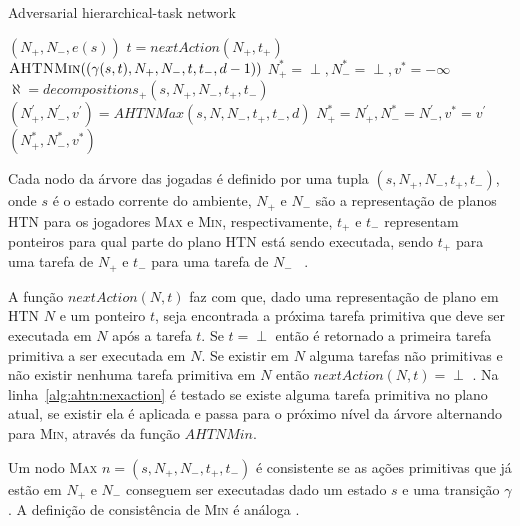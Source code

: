 \begin{algorithm}
	\caption{Adversarial hierarchical-task network}
	\label{alg:ahtn}
	\begin{algorithmic}[1]		
		\label{alg:lin:firstLine}
		\State	\Return $(N_{+}, N_{-}, e(s))$
		\EndIf
		 \label{alg:ahtn:nexaction}
		\State $t = nextAction(N_{+}, t_{+})$ 
		\State \Return $\Call{AHTNMin}{(\gamma(s,t), N_{+}, N_{-}, t, t_{-}, d-1)}$ \label{alg:ahtn:troca}
		\EndIf
		\State $N_{+}^{*} = \perp, N_{-}^{*} = \perp, v^{*} = -\infty$
		\State $\aleph = decompositions_{+}(s, N_{+}, N_{-}, t_{+}, t_{-})$ \label{alg:decompositions}
		 \label{alg:ahtn:for}
		\State $(N^{'}_{+}, N^{'}_{-}, v^{'}) = AHTNMax(s, N, N_{-}, t_{+}, t_{-}, d)$
		\State $N_{+}^{*} = N^{'}_{+}, N_{-}^{*} = N^{'}_{-}, v^{*} = v^{'} $
		\EndIf
		\EndFor		
		\State \Return $(N_{+}^{*}, N_{-}^{*}, v^{*} )$
		\EndFunction
	\end{algorithmic}
\end{algorithm}

Cada nodo da árvore das jogadas é definido por uma tupla $(s, N_{+}, N_{-}, t_{+}, t_{-})$, onde $s$ é o estado corrente do ambiente, $N_{+}$ e $N_{-}$ são a representação de planos HTN para os jogadores \textsc{Max} e \textsc{Min}, respectivamente, $t_{+}$ e $t_{-}$ representam ponteiros para qual parte do plano HTN está sendo executada, sendo $t_{+}$ para uma tarefa de $N_{+}$ e $t_{-}$ para uma tarefa de $N_{-}$ ~\cite{ontanon2015adversarial}.

A função $nextAction(N,t)$ faz com que, dado uma representação de plano em HTN $N$ e um ponteiro $t$, seja encontrada a próxima tarefa primitiva que deve ser executada em $N$ após a tarefa $t$. Se $t = \perp$ então é retornado a primeira tarefa primitiva a ser executada em $N$. 
Se existir em $N$ alguma tarefas não primitivas e não existir nenhuma tarefa primitiva em $N$ então $nextAction(N,t) = \perp$ \cite{ontanon2015adversarial}.
Na linha~\ref{alg:ahtn:nexaction} é testado se existe alguma tarefa primitiva no plano atual, se existir ela é aplicada e passa para o próximo nível da árvore alternando para \textsc{Min}, através da função $AHTNMin$. 

Um nodo \textsc{Max} $n = (s, N_{+}, N_{-}, t_{+}, t_{-})$ é consistente se as ações primitivas que já estão em $N_{+}$ e $N_{-}$ conseguem ser executadas dado um estado $s$ e uma transição $\gamma$. A definição de consistência de \textsc{Min} é análoga \cite{ontanon2015adversarial}.

